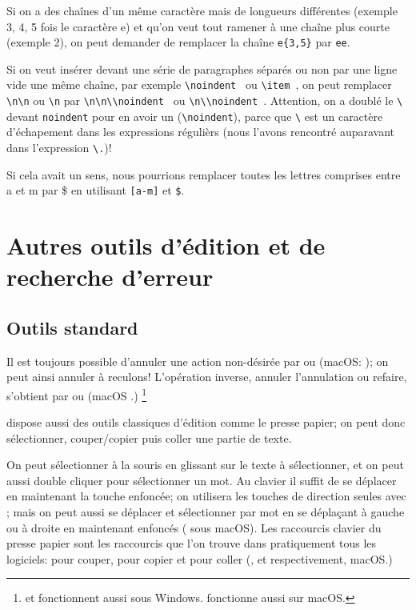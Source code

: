 Si on a des chaînes d'un même caractère mais de longueurs différentes (exemple 3, 4, 5 fois le caractère e) et qu'on veut tout ramener à une chaîne plus courte (exemple 2), on peut demander de remplacer la chaîne {\frq\verb+e{3,5}+\flq} par {\frq\verb+ee+\flq}.

Si on veut insérer devant une série de paragraphes séparés ou non par une ligne vide une même chaîne, par exemple {\frq\verb*+\noindent +\flq} ou {\frq\verb*+\item +\flq}, on peut remplacer {\frq\verb+\n\n+\flq} ou {\frq\verb+\n+\flq} par {\frq\verb*+\n\n\\noindent +\flq} ou {\frq\verb*+\n\\noindent +\flq}. Attention, on a doublé le \verb|\| devant \verb|noindent| pour en avoir un (\verb|\noindent|), parce que \verb|\| est un caractère d'échapement dans les expressions régulièrs (nous l'avons rencontré auparavant dans l'expression \verb|\.|)!

Si cela avait un sens, nous pourrions remplacer toutes les lettres comprises entre \og a\fg{} et \og m\fg{} par \og \$\fg{} en utilisant {\frq\verb+[a-m]+\flq} et {\frq\verb+$+\flq}.

\section{Autres outils d'édition et de recherche d'erreur}

\subsection{Outils standard}

Il est toujours possible d'annuler une action non-désirée par \submenu{} ou  (macOS: ); on peut ainsi annuler à reculons! L'opération inverse, annuler l'annulation ou refaire, s'obtient par \submenu{} ou  (macOS .) \footnote{ et  fonctionnent aussi sous Windows.  fonctionne aussi sur macOS.} 

\Tw{} dispose aussi des outils classiques d'édition comme le presse papier; on peut donc sélectionner, couper/copier puis coller une partie de texte.

On peut sélectionner à la souris en \og glissant\fg{} sur le texte à sélectionner, et on peut aussi \og double cliquer\fg{} pour sélectionner un mot. Au clavier il suffit de se déplacer en maintenant la touche  enfoncée; on utilisera les touches de direction seules avec  ; mais on peut aussi se déplacer et sélectionner par mot en se déplaçant à gauche ou à droite en maintenant  enfoncés ( sous macOS). Les raccourcis clavier du presse papier sont les raccourcis que l'on trouve dans pratiquement tous les logiciels:  pour couper,  pour copier et  pour coller (,  et  respectivement, macOS.)

